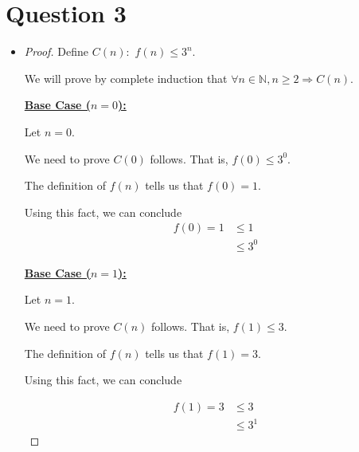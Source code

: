 \documentclass[12pt]{article}
\begin{document}
\section*{Question 3}
\begin{itemize}
    \item

    \begin{proof}

    Define $C(n):$ $f(n) \leq 3^n$.

    \bigskip

    We will prove by complete induction that $\forall n \in \mathbb{N}, n \geq 2 \Rightarrow C(n)$.

    \bigskip

    \underline{\textbf{Base Case ($n = 0$):}}

    \bigskip

    Let $n = 0$.

    \bigskip

    We need to prove $C(0)$ follows. That is, $f(0) \leq 3^0$.

    \bigskip

    The definition of $f(n)$ tells us that $f(0) = 1$.

    \bigskip

    Using this fact, we can conclude
    \setcounter{equation}{0}
    \begin{align}
        f(0) = 1 &\leq 1\\
        &\leq 3^0
    \end{align}

    \bigskip

    \underline{\textbf{Base Case ($n = 1$):}}

    \bigskip

    Let $n = 1$.

    \bigskip

    We need to prove $C(n)$ follows. That is, $f(1) \leq 3$.

    \bigskip

    The definition of $f(n)$ tells us that $f(1) = 3$.

    \bigskip

    Using this fact, we can conclude

    \begin{align}
        f(1) = 3 &\leq 3\\
        &\leq 3^1
    \end{align}

    \bigskip


\end{proof}
\end{itemize}
\end{document}
